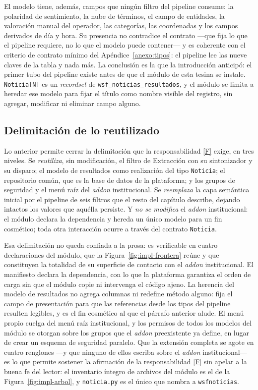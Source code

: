 \documentclass[12pt]{report}
\DeclareRobustCommand{\resp}[1]{\hyperref[tab:registro-responsabilidades]{\textcolor{respcolor}{[#1]}}}
\begin{document}
El modelo tiene, además, campos que ningún filtro del pipeline consume: la polaridad de sentimiento, la nube de términos, el campo de entidades, la valoración manual del operador, las categorías, las coordenadas y los campos derivados de día y hora. Su presencia no contradice el contrato ---que fija lo que el pipeline requiere, no lo que el modelo puede contener--- y es coherente con el criterio de contrato mínimo del Apéndice~\ref{anexo:tipos}: el pipeline lee las nueve claves de la tabla y nada más. La conclusión es la que la introducción anticipó: el primer tubo del pipeline existe antes de que el módulo de esta tesina se instale. \texttt{Noticia[N]} es un \textit{recordset} de \texttt{wsf\_noticias\_resultados}, y el módulo se limita a heredar ese modelo para fijar el título como nombre visible del registro, sin agregar, modificar ni eliminar campo alguno.

\subsection{Delimitación de lo reutilizado}
\label{sec:impl-pre-delimitacion}

Lo anterior permite cerrar la delimitación que la responsabilidad \resp{F} exige, en tres niveles. Se \textit{reutiliza}, sin modificación, el filtro de Extracción con su sintonizador y su disparo; el modelo de resultados como realización del tipo \texttt{Noticia}; el repositorio común, que es la base de datos de la plataforma; y los grupos de seguridad y el menú raíz del \textit{addon} institucional. Se \textit{reemplaza} la capa semántica inicial por el pipeline de seis filtros que el resto del capítulo describe, dejando intactos los valores que aquélla persiste. Y \textit{no se modifica} el \textit{addon} institucional: el módulo declara la dependencia y hereda un único modelo para un fin cosmético; toda otra interacción ocurre a través del contrato \texttt{Noticia}.

Esa delimitación no queda confiada a la prosa: es verificable en cuatro declaraciones del módulo, que la Figura~\ref{fig:impl-frontera} reúne y que constituyen la totalidad de su superficie de contacto con el \textit{addon} institucional. El manifiesto declara la dependencia, con lo que la plataforma garantiza el orden de carga sin que el módulo copie ni intervenga el código ajeno. La herencia del modelo de resultados no agrega columnas ni redefine método alguno: fija el campo de presentación para que las referencias desde los tipos del pipeline resulten legibles, y es el fin cosmético al que el párrafo anterior alude. El menú propio cuelga del menú raíz institucional, y los permisos de todos los modelos del módulo se otorgan sobre los grupos que el \textit{addon} preexistente ya define, en lugar de crear un esquema de seguridad paralelo. Que la extensión completa se agote en cuatro renglones ---y que ninguno de ellos escriba sobre el \textit{addon} institucional--- es lo que permite sostener la afirmación de la responsabilidad \resp{F} sin apelar a la buena fe del lector: el inventario íntegro de archivos del módulo es el de la Figura~\ref{fig:impl-arbol}, y \texttt{noticia.py} es el único que nombra a \texttt{wsfnoticias}.
\end{document}
